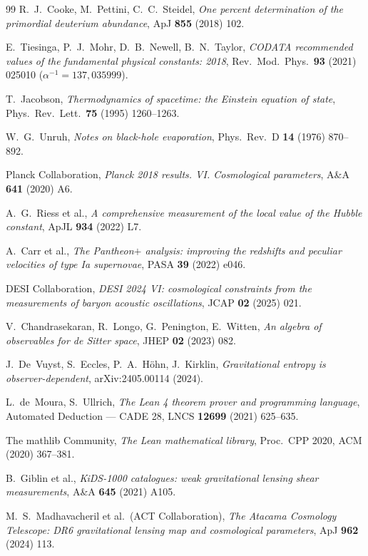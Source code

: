 \documentclass[11pt]{article}
\theoremstyle{definition}\newtheorem{deriv}{Derivação}
\begin{document}
\begin{thebibliography}{99}
 R.~J.~Cooke, M.~Pettini, C.~C.~Steidel, \emph{One percent determination of the primordial deuterium abundance}, ApJ \textbf{855} (2018) 102.

 E.~Tiesinga, P.~J.~Mohr, D.~B.~Newell, B.~N.~Taylor, \emph{CODATA recommended values of the fundamental physical constants: 2018}, Rev.\ Mod.\ Phys.\ \textbf{93} (2021) 025010 ($\alpha^{-1}=137{,}035999$).

 T.~Jacobson, \emph{Thermodynamics of spacetime: the Einstein equation of state}, Phys.\ Rev.\ Lett.\ \textbf{75} (1995) 1260--1263.

 W.~G.~Unruh, \emph{Notes on black-hole evaporation}, Phys.\ Rev.\ D \textbf{14} (1976) 870--892.

 Planck Collaboration, \emph{Planck 2018 results. VI. Cosmological parameters}, A\&A \textbf{641} (2020) A6.

 A.~G.~Riess et al., \emph{A comprehensive measurement of the local value of the Hubble constant}, ApJL \textbf{934} (2022) L7.

 A.~Carr et al., \emph{The Pantheon$+$ analysis: improving the redshifts and peculiar velocities of type Ia supernovae}, PASA \textbf{39} (2022) e046.

 DESI Collaboration, \emph{DESI 2024 VI: cosmological constraints from the measurements of baryon acoustic oscillations}, JCAP \textbf{02} (2025) 021.

 V.~Chandrasekaran, R.~Longo, G.~Penington, E.~Witten, \emph{An algebra of observables for de Sitter space}, JHEP \textbf{02} (2023) 082.

 J.~De~Vuyst, S.~Eccles, P.~A.~Höhn, J.~Kirklin, \emph{Gravitational entropy is observer-dependent}, arXiv:2405.00114 (2024).

 L.~de~Moura, S.~Ullrich, \emph{The Lean 4 theorem prover and programming language}, Automated Deduction --- CADE 28, LNCS \textbf{12699} (2021) 625--635.

 The mathlib Community, \emph{The Lean mathematical library}, Proc.\ CPP 2020, ACM (2020) 367--381.

 B.~Giblin et al., \emph{KiDS-1000 catalogues: weak gravitational lensing shear measurements}, A\&A \textbf{645} (2021) A105.

 M.~S.~Madhavacheril et al.\ (ACT Collaboration), \emph{The Atacama Cosmology Telescope: DR6 gravitational lensing map and cosmological parameters}, ApJ \textbf{962} (2024) 113.


\end{thebibliography}
\end{document}
